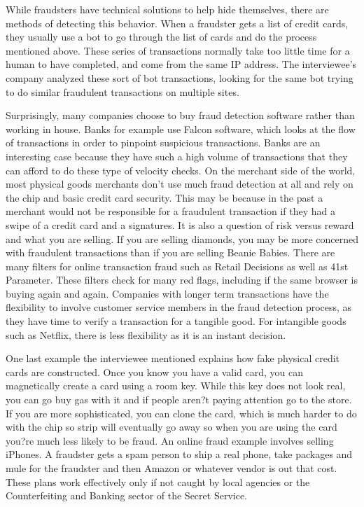 \documentclass[midd]{thesis}
\begin{document}
While fraudsters have technical solutions to help hide themselves, there are methods of detecting this behavior. When a fraudster gets a list of credit cards, they usually use a bot to go through the list of cards and do the process mentioned above. These series of transactions normally take too little time for a human to have completed, and come from the same IP address. The interviewee's company analyzed these sort of bot transactions, looking for the same bot trying to do similar fraudulent transactions on multiple sites. 

Surprisingly, many companies choose to buy fraud detection software rather than working in house. Banks for example use Falcon software, which looks at the flow of transactions in order to pinpoint suspicious transactions. Banks are an interesting case because they have such a high volume of transactions that they can afford to do these type of velocity checks. On the merchant side of the world, most physical goods merchants don't use much fraud detection at all and rely on the chip and basic credit card security. This may be because in the past a merchant would not be responsible for a fraudulent transaction if they had a swipe of a credit card and a signatures. It is also a question of risk versus reward and what you are selling. If you are selling diamonds, you may be more concerned with fraudulent transactions than if you are selling Beanie Babies. There are many filters for online transaction fraud such as Retail Decisions as well as 41st Parameter. These filters check for many red flags, including if the same browser is buying again and again. Companies with longer term transactions have the flexibility to involve customer service members in the fraud detection process, as they have time to verify a transaction for a tangible good. For intangible goods such as Netflix, there is less flexibility as it is an instant decision. 

One last example the interviewee mentioned explains how fake physical credit cards are constructed. Once you know you have a valid card, you can magnetically create a card using a room key. While this key does not look real, you can go buy gas with it and if people aren?t paying attention go to the store. If you are more sophisticated, you can clone the card, which is much harder to do with the chip so strip will eventually go away so when you are using the card you?re much less likely to be fraud. An online fraud example involves selling iPhones. A fraudster gets a spam person to ship a real phone, take packages and mule for the fraudster and then Amazon or whatever vendor is out that cost. These plans work effectively only if not caught by local agencies or the Counterfeiting and Banking sector of the Secret Service. 
\end{document}
